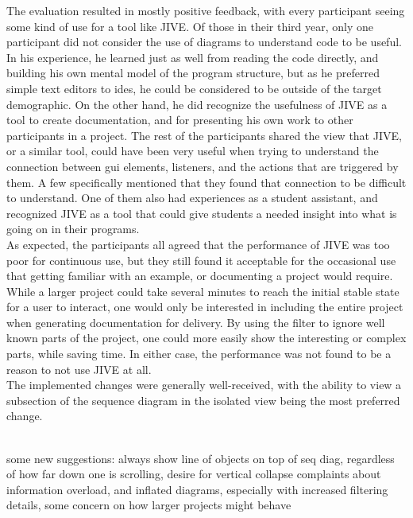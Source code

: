 The evaluation resulted in mostly positive feedback, with every participant seeing some kind of use for a tool like JIVE.
Of those in their third year, only one participant did not consider the use of diagrams to understand code to be useful.
In his experience, he learned just as well from reading the code directly, and building his own mental model of the program structure, but as he preferred simple text editors to \gls{ide}s, he could be considered to be outside of the target demographic.
On the other hand, he did recognize the usefulness of JIVE as a tool to create documentation, and for presenting his own work to other participants in a project.
The rest of the participants shared the view that JIVE, or a similar tool, could have been very useful when trying to understand the connection between \gls{gui} elements, listeners, and the actions that are triggered by them.
A few specifically mentioned that they found that connection to be difficult to understand.
One of them also had experiences as a student assistant, and recognized JIVE as a tool that could give students a needed insight into what is going on in their programs.
~\\

As expected, the participants all agreed that the performance of JIVE was too poor for continuous use, but they still found it acceptable for the occasional use that getting familiar with an example, or documenting a project would require.
While a larger project could take several minutes to reach the initial stable state for a user to interact, one would only be interested in including the entire project when generating documentation for delivery.
By using the filter to ignore well known parts of the project, one could more easily show the interesting or complex parts, while saving time.
In either case, the performance was not found to be a reason to not use JIVE at all.
~\\

The implemented changes were generally well-received, with the ability to view a subsection of the sequence diagram in the isolated view being the most preferred change.

~\\


some new suggestions: always show line of objects on top of seq diag, regardless of how far down one is scrolling, desire for vertical collapse
complaints about information overload, and inflated diagrams, especially with increased filtering details, some concern on how larger projects might behave
